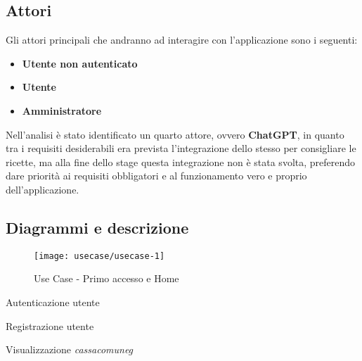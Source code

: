 \subsection{Attori}
Gli attori principali che andranno ad interagire con l'applicazione sono i seguenti:
\begin{itemize}
    \item \textbf{Utente non autenticato}
    \item \textbf{Utente}
    \item \textbf{Amministratore}
\end{itemize}
Nell'analisi è stato identificato un quarto attore, ovvero \textbf{ChatGPT}, in quanto tra i requisiti desiderabili era prevista l'integrazione dello stesso per consigliare le ricette, ma alla fine dello stage questa integrazione non è stata svolta, preferendo dare priorità ai requisiti obbligatori e al funzionamento vero e proprio dell'applicazione.

\newpage

\subsection{Diagrammi e descrizione}

\begin{figure}[!h] 
    \centering 
    \texttt{[image: usecase/usecase-1]} 
    \caption{Use Case - Primo accesso e Home}
\end{figure}

\begin{usecase}{1}{Autenticazione utente}
\end{usecase}

\begin{usecase}{2}{Registrazione utente}
\end{usecase}

\begin{usecase}{3}{Visualizzazione \emph{\gls{cassacomuneg}}}
\end{usecase}

